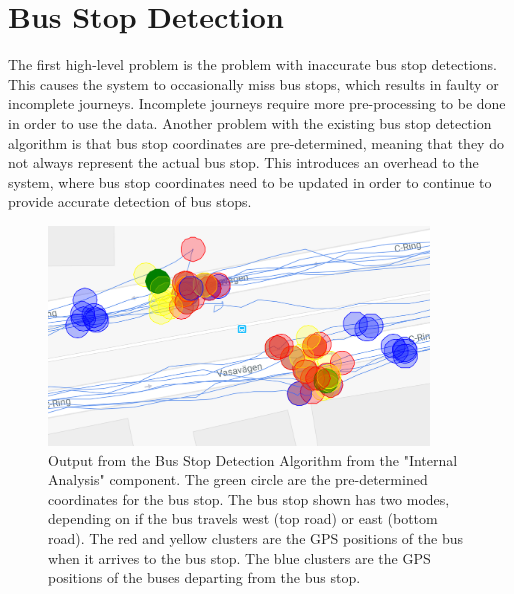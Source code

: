 \chapter{Bus Stop Detection}
\label{cha:bus-stop-detection}

The first high-level problem is the problem with inaccurate bus stop detections.
This causes the system to occasionally miss bus stops, which results in faulty or incomplete journeys.
Incomplete journeys require more pre-processing to be done in order to use the data.
Another problem with the existing bus stop detection algorithm is that bus stop coordinates are pre-determined, meaning that they do not always represent the actual bus stop.
This introduces an overhead to the system, where bus stop coordinates need to be updated in order to continue to provide accurate detection of bus stops.

\begin{figure}[ht!]
    \centering
    \includegraphics[width=0.9\textwidth]{figures/bus_stops}
    \caption{Output from the Bus Stop Detection Algorithm from the "Internal Analysis" component.
    The green circle are the pre-determined coordinates for the bus stop.
    The bus stop shown has two modes, depending on if the bus travels west (top road) or east (bottom road).
    The red and yellow clusters are the GPS positions of the bus when it arrives to the bus stop.
    The blue clusters are the GPS positions of the buses departing from the bus stop.
    }
    \label{fig:bus-stop-clusters}
\end{figure}

